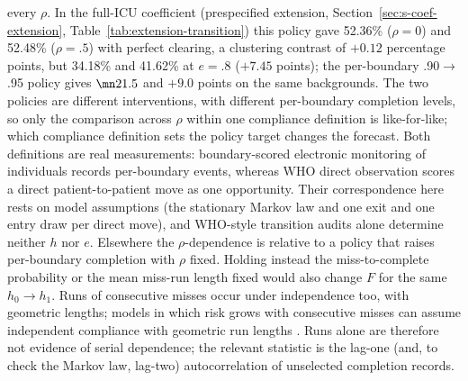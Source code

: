 every $\rho$. In the full-ICU coefficient (prespecified extension,
Section~\ref{sec:s-coef-extension}, Table~\ref{tab:extension-transition}) this
policy gave 52.36\% ($\rho=0$) and 52.48\% ($\rho=.5$) with perfect clearing, a
clustering contrast of $+0.12$ percentage points, but 34.18\% and 41.62\% at
$e=.8$ ($+7.45$ points); the per-boundary .90$\to$.95 policy gives $\mn21.5$
and $+9.0$ points on the same backgrounds. The two policies are different
interventions, with different per-boundary completion levels, so only the
comparison across $\rho$ within one compliance definition is like-for-like;
which compliance definition sets the policy target changes the forecast. Both
definitions are real measurements: boundary-scored electronic monitoring of
individuals records per-boundary events, whereas WHO direct observation scores a
direct patient-to-patient move as one opportunity. Their
correspondence here rests on model assumptions (the stationary Markov law and
one exit and one entry draw per direct move), and WHO-style transition audits
alone determine neither $h$ nor $e$. Elsewhere the $\rho$-dependence is
relative to a policy that raises per-boundary completion with $\rho$ fixed. Holding instead the
miss-to-complete probability or the mean miss-run length fixed would also change
$F$ for the same $h_0\to h_1$. Runs of consecutive misses occur under independence
too, with geometric lengths; models in which risk grows with consecutive misses
can assume independent compliance with geometric run lengths \citep{chan2026}.
Runs alone are therefore not evidence of serial dependence; the relevant
statistic is the lag-one (and, to check the Markov law, lag-two)
autocorrelation of unselected completion records.

